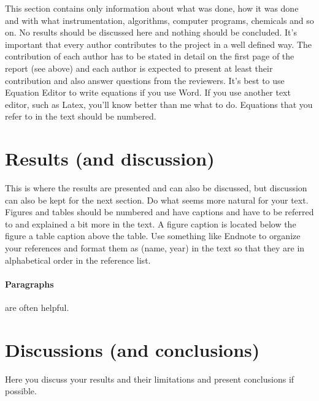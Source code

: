 \documentclass{article}
\begin{document}
\begin{multicols}{2}
This section contains only information about what was done, how it was done and with what 
instrumentation, algorithms, computer programs, chemicals and so on. 
No results should be discussed here and nothing should be concluded. 
It’s important that every author contributes to the project in a well defined way. 
The contribution of each author has to be stated in detail on the first page of the report (see 
above) and each author is expected to present at least their contribution and also answer 
questions from the reviewers. 
It’s best to use Equation Editor to write equations if you use Word. If you use another text 
editor, such as Latex, you’ll know better than me what to do. 
Equations that you refer to in the text should be numbered. 


\section*{Results (and discussion)}

This is where the results are presented and can also be discussed, but discussion can also be 
kept for the next section. Do what seems more natural for your text. 
Figures and tables should be numbered and have captions and have to be referred to and 
explained a bit more in the text. 
A figure caption is located below the figure a table caption above the table. 
Use something like Endnote to organize your references and format them as (name, year) in 
the text so that they are in alphabetical order in the reference list. 


\paragraph{Paragraphs} are often helpful.

\section*{Discussions (and conclusions)}

Here you discuss your results and their limitations and present conclusions if possible.

\end{multicols}
\clearpage
{}
\printbibliography
\end{document}
